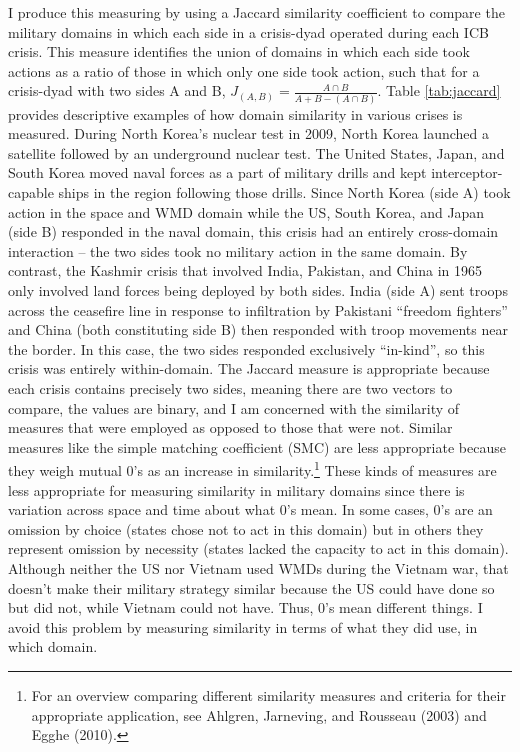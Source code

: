 \documentclass[
]{article}
\begin{document}
I produce this measuring by using a Jaccard similarity coefficient to compare the military domains in which each side in a crisis-dyad operated during each ICB crisis. This measure identifies the union of domains in which each side took actions as a ratio of those in which only one side took action, such that for a crisis-dyad with two sides A and B, \(J_{(A, B)} = \frac{A \cap B}{A + B - (A \cap B)}\). Table \ref{tab:jaccard} provides descriptive examples of how domain similarity in various crises is measured. During North Korea's nuclear test in 2009, North Korea launched a satellite followed by an underground nuclear test. The United States, Japan, and South Korea moved naval forces as a part of military drills and kept interceptor-capable ships in the region following those drills. Since North Korea (side A) took action in the space and WMD domain while the US, South Korea, and Japan (side B) responded in the naval domain, this crisis had an entirely cross-domain interaction -- the two sides took no military action in the same domain. By contrast, the Kashmir crisis that involved India, Pakistan, and China in 1965 only involved land forces being deployed by both sides. India (side A) sent troops across the ceasefire line in response to infiltration by Pakistani ``freedom fighters'' and China (both constituting side B) then responded with troop movements near the border. In this case, the two sides responded exclusively ``in-kind'', so this crisis was entirely within-domain. The Jaccard measure is appropriate because each crisis contains precisely two sides, meaning there are two vectors to compare, the values are binary, and I am concerned with the similarity of measures that were employed as opposed to those that were not. Similar measures like the simple matching coefficient (SMC) are less appropriate because they weigh mutual 0's as an increase in similarity.\footnote{For an overview comparing different similarity measures and criteria for their appropriate application, see Ahlgren, Jarneving, and Rousseau (2003) and Egghe (2010).} These kinds of measures are less appropriate for measuring similarity in military domains since there is variation across space and time about what 0's mean. In some cases, 0's are an omission by choice (states chose not to act in this domain) but in others they represent omission by necessity (states lacked the capacity to act in this domain). Although neither the US nor Vietnam used WMDs during the Vietnam war, that doesn't make their military strategy similar because the US could have done so but did not, while Vietnam could not have. Thus, 0's mean different things. I avoid this problem by measuring similarity in terms of what they did use, in which domain.
\end{document}
